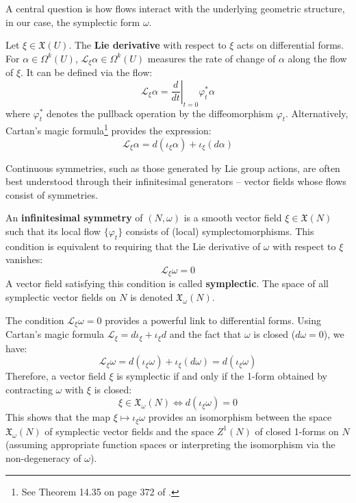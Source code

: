 A central question is how flows interact with the underlying geometric structure, in our case, the symplectic form $\omega$.

\begin{definition}
Let $\xi \in \mathfrak{X}(U)$. The \textbf{Lie derivative} with respect to $\xi$ acts on differential forms. For $\alpha \in \Omega^{k}(U)$, $\mathcal{L}_\xi \alpha \in \Omega^{k}(U)$ measures the rate of change of $\alpha$ along the flow of $\xi$. It can be defined via the flow:
\[
\mathcal{L}_\xi \alpha = \left. \frac{d}{dt} \right|_{t=0} \varphi_t^* \alpha
\]
where $\varphi_t^*$ denotes the pullback operation by the diffeomorphism $\varphi_t$. Alternatively, Cartan's magic formula\footnote{See Theorem 14.35 on page 372 of \cite{Lee2013}.} provides the expression:
\[
\mathcal{L}_\xi \alpha = d(\iota_\xi \alpha) + \iota_\xi(d \alpha)
\]
\end{definition}

Continuous symmetries, such as those generated by Lie group actions, are often best understood through their infinitesimal generators – vector fields whose flows consist of symmetries.

\begin{definition}
An \textbf{infinitesimal symmetry} of $(N, \omega)$ is a smooth vector field $\xi \in \mathfrak{X}(N)$ such that its local flow $\{\varphi_t\}$ consists of (local) symplectomorphisms. This condition is equivalent to requiring that the Lie derivative of $\omega$ with respect to $\xi$ vanishes:
\[ \mathcal{L}_\xi \omega = 0 \]
A vector field satisfying this condition is called \textbf{symplectic}. The space of all symplectic vector fields on $N$ is denoted $\mathfrak{X}_{\omega}(N)$.
\end{definition}

The condition $\mathcal{L}_\xi \omega = 0$ provides a powerful link to differential forms. Using Cartan's magic formula $\mathcal{L}_\xi = d \iota_\xi + \iota_\xi d$ and the fact that $\omega$ is closed ($d\omega = 0$), we have:
\[ \mathcal{L}_\xi \omega = d(\iota_\xi \omega) + \iota_\xi(d\omega) = d(\iota_\xi \omega) \]
Therefore, a vector field $\xi$ is symplectic if and only if the 1-form obtained by contracting $\omega$ with $\xi$ is closed:
\[ \xi \in \mathfrak{X}_{\omega}(N) \iff d(\iota_\xi \omega) = 0 \]
This shows that the map $\xi \mapsto \iota_\xi \omega$ provides an isomorphism between the space $\mathfrak{X}_{\omega}(N)$ of symplectic vector fields and the space $Z^1(N)$ of closed 1-forms on $N$ (assuming appropriate function spaces or interpreting the isomorphism via the non-degeneracy of $\omega$).

